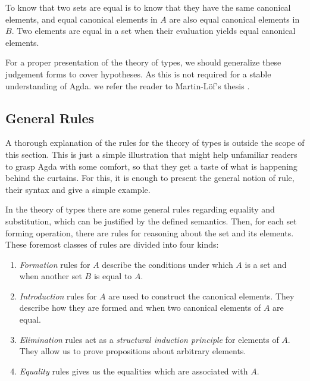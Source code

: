 To know that two sets are equal is to know that they have the same canonical elements, and
equal canonical elements in $A$ are also equal canonical elements in $B$. Two elements are
equal in a set when their evaluation yields equal canonical elements.

For a proper presentation of the theory of types, we should generalize these judgement forms
to cover hypotheses. As this is not required for 
a stable understanding of Agda. we refer the reader to Martin-L\"{o}f's thesis \cite{lof84,lof85}.

\subsection{General Rules}

A thorough explanation of the rules for the theory of types is outside the scope of this section. 
This is just a simple illustration that might help unfamiliar readers to grasp Agda with
some comfort, so that they get a taste of what is happening behind the curtains. For this, it is enough 
to present the general notion of rule, their syntax and give a simple example.

In the theory of types there are some general rules regarding equality and substitution, 
which can be justified by the defined semantics. Then, for each set forming operation, there
are rules for reasoning about the set and its elements. These foremost classes of rules
are divided into four kinds:

\begin{enumerate} %
  \item \emph{Formation} rules for $A$ describe the conditions under which $A$ is a set and
        when another set $B$ is equal to $A$.
        
  \item \emph{Introduction} rules for $A$ are used to construct the canonical elements. They
        describe how they are formed and when two canonical elements of $A$ are equal.
        
  \item \emph{Elimination} rules act as a \emph{structural induction principle} for elements of $A$.
        They allow us to prove propositions about arbitrary elements.
        
  \item \emph{Equality} rules gives us the equalities which are associated with $A$.
\end{enumerate}

